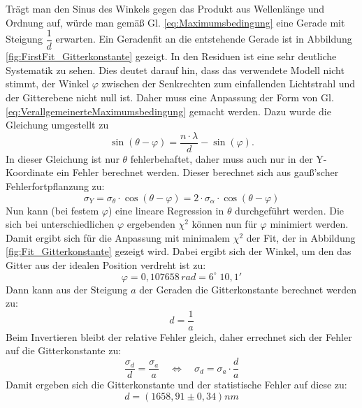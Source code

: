 \documentclass[12pt,a4paper]{article}
\begin{document}
	Trägt man den Sinus des Winkels gegen das Produkt aus Wellenlänge und Ordnung auf, würde man gemäß Gl. \ref{eq:Maximumsbedingung} eine Gerade mit Steigung $\dfrac{1}{d}$ erwarten. Ein Geradenfit an die entstehende Gerade ist in Abbildung \ref{fig:FirstFit_Gitterkonstante} gezeigt. In den Residuen ist eine sehr deutliche Systematik zu sehen. Dies deutet darauf hin, dass das verwendete Modell nicht stimmt, der Winkel $\varphi$ zwischen der Senkrechten zum einfallenden Lichtstrahl und der Gitterebene nicht null ist. Daher muss eine Anpassung der Form von Gl. \ref{eq:VerallgemeinerteMaximumsbedingung} gemacht werden. Dazu wurde die Gleichung umgestellt zu
	\begin{equation}
	\sin (\theta - \varphi) = \dfrac{n \cdot \lambda}{d} - \sin (\varphi).
	\end{equation}
	In dieser Gleichung ist nur $\theta$ fehlerbehaftet, daher muss auch nur in der Y-Koordinate ein Fehler berechnet werden. Dieser berechnet sich aus gauß'scher Fehlerfortpflanzung zu:
	\begin{equation}
	\sigma _Y = \sigma _{\theta} \cdot \cos(\theta - \varphi) = 2 \cdot \sigma _{\alpha} \cdot \cos(\theta - \varphi)
	\end{equation}
	Nun kann (bei festem $\varphi$) eine lineare Regression in $\theta$ durchgeführt werden. Die sich bei unterschiedlichen $\varphi$ ergebenden $\chi ^2$ können nun für $\varphi$ minimiert werden. Damit ergibt sich für die Anpassung mit minimalem $\chi ^2$ der Fit, der in Abbildung \ref{fig:Fit_Gitterkonstante} gezeigt wird. Dabei ergibt sich der Winkel, um den das Gitter aus der idealen Position verdreht ist zu:
	\begin{equation*}
	\varphi = 0,107658 \, rad = 6 ^{\circ} \; 10,1'
	\end{equation*}
	Dann kann aus der Steigung $a$ der Geraden die Gitterkonstante berechnet werden zu:
	\begin{equation}
	d = \dfrac{1}{a}
	\end{equation}
	Beim Invertieren bleibt der relative Fehler gleich, daher errechnet sich der Fehler auf die Gitterkonstante zu:
	\begin{equation}
	\dfrac{\sigma_d}{d} = \dfrac{\sigma_a}{a} \quad \Leftrightarrow \quad \sigma_d = \sigma_a \cdot \dfrac{d}{a}
	\end{equation}
	Damit ergeben sich die Gitterkonstante und der statistische Fehler auf diese zu:
	\begin{equation*}
	d = (1658,91 \pm 0,34)nm
	\end{equation*}
	
\end{document}

